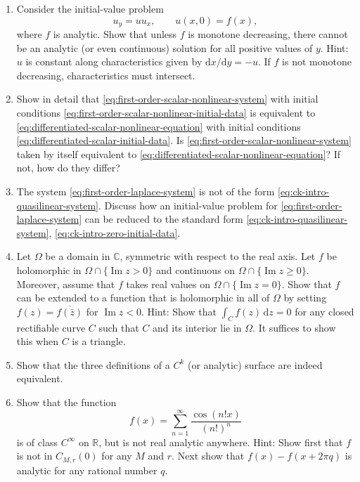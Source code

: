 \begin{enumerate}[label=\thesection.\arabic*.,ref=\thesection.\arabic*,start=7,series=book-problems]
\item\label{ex:nonlinear-analytic-breakdown} Consider the initial-value problem
\begin{equation}\label{eq:nonlinear-cauchy-characteristic-problem}
u_y=uu_x,\qquad u(x,0)=f(x),
\end{equation}
where $f$ is analytic. Show that unless $f$ is monotone decreasing, there cannot be an analytic (or even continuous) solution for all positive values of $y$. Hint: $u$ is constant along characteristics given by $\mathrm{d}x/\mathrm{d}y=-u$. If $f$ is not monotone decreasing, characteristics must intersect.

\item\label{ex:reduced-initial-problem-equivalence} Show in detail that \eqref{eq:first-order-scalar-nonlinear-system} with initial conditions \eqref{eq:first-order-scalar-nonlinear-initial-data} is equivalent to \eqref{eq:differentiated-scalar-nonlinear-equation} with initial conditions \eqref{eq:differentiated-scalar-initial-data}. Is \eqref{eq:first-order-scalar-nonlinear-system} taken by itself equivalent to \eqref{eq:differentiated-scalar-nonlinear-equation}? If not, how do they differ?

\item\label{ex:laplace-system-standard-form} The system \eqref{eq:first-order-laplace-system} is not of the form \eqref{eq:ck-intro-quasilinear-system}. Discuss how an initial-value problem for \eqref{eq:first-order-laplace-system} can be reduced to the standard form \eqref{eq:ck-intro-quasilinear-system}, \eqref{eq:ck-intro-zero-initial-data}.

\item\label{ex:schwarz-reflection-principle} Let $\Omega$ be a domain in $\mathbb{C}$, symmetric with respect to the real axis. Let $f$ be holomorphic in $\Omega\cap\{\operatorname{Im}z>0\}$ and continuous on $\Omega\cap\{\operatorname{Im}z\geq0\}$. Moreover, assume that $f$ takes real values on $\Omega\cap\{\operatorname{Im}z=0\}$. Show that $f$ can be extended to a function that is holomorphic in all of $\Omega$ by setting $f(z)=\overline{f(\bar z)}$ for $\operatorname{Im}z<0$. Hint: Show that $\int_Cf(z)\,\mathrm{d}z=0$ for any closed rectifiable curve $C$ such that $C$ and its interior lie in $\Omega$. It suffices to show this when $C$ is a triangle.

\item\label{ex:surface-descriptions-equivalent} Show that the three definitions of a $C^k$ (or analytic) surface are indeed equivalent.

\item\label{ex:smooth-nowhere-analytic-function} Show that the function
\begin{equation}\label{eq:smooth-nowhere-analytic-series}
f(x)=\sum_{n=1}^{\infty}\dfrac{\cos(n!x)}{(n!)^n}
\end{equation}
is of class $C^\infty$ on $\mathbb{R}$, but is not real analytic anywhere. Hint: Show first that $f$ is not in $C_{M,r}(0)$ for any $M$ and $r$. Next show that $f(x)-f(x+2\pi q)$ is analytic for any rational number $q$.

\end{enumerate}
